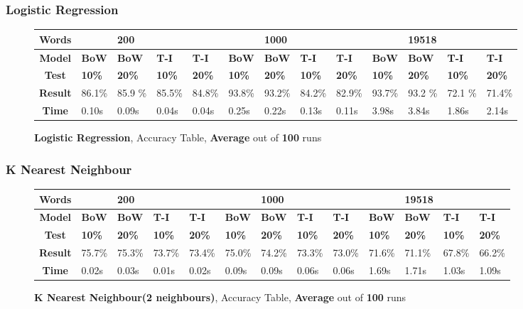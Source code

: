 \documentclass{article}
\begin{document}
	\subsubsection{Logistic Regression}
	\begin{figure}[H]
		\begin{tabular}{||c||l|l|l|l||l|l|l|l||l|l|l|l||}
			\hline
			\textbf{Words} &  & \textbf{200} & & & &\textbf{1000} & & & & \textbf{19518} &  & \\ \hline 
			\textbf{Model} & \textbf{BoW} & \textbf{BoW} & \textbf{T-I} & \textbf{T-I} &\textbf{BoW} & \textbf{BoW} & \textbf{T-I} & \textbf{T-I} & \textbf{BoW} & \textbf{BoW} & \textbf{T-I} & \textbf{T-I}\\ \hline
			\textbf{Test} & \textbf{10\%} & \textbf{20\%} & \textbf{10\%} & \textbf{20\%} & \textbf{10\%} & \textbf{20\%} & \textbf{10\%} & \textbf{20\%} & \textbf{10\%} & \textbf{20\%} & \textbf{10\%} & \textbf{20\%} \\ \hline \hline  
			\textbf{Result} & 86.1\% &85.9 \% & 85.5\% & 84.8\% &93.8\% &93.2\% &84.2\% & 82.9\% & 93.7\% &93.2 \% &72.1 \% &71.4\% \\ \hline 
			\textbf{Time} & 0.10s & 0.09s & 0.04s & 0.04s & 0.25s & 0.22s & 0.13s &0.11s & 3.98s & 3.84s & 1.86s & 2.14s \\ \hline 
		\end{tabular}
		\caption{\textbf{Logistic Regression}, Accuracy Table, \textbf{Average} out of \textbf{100} runs}
	\end{figure} 

	\subsubsection{K Nearest Neighbour}
	\begin{figure}[H]
		\begin{tabular}{||c||l|l|l|l||l|l|l|l||l|l|l|l||}
			\hline
			\textbf{Words} &  & \textbf{200} & & & &\textbf{1000} & & & & \textbf{19518} &  & \\ \hline 
			\textbf{Model} & \textbf{BoW} & \textbf{BoW} & \textbf{T-I} & \textbf{T-I} &\textbf{BoW} & \textbf{BoW} & \textbf{T-I} & \textbf{T-I} & \textbf{BoW} & \textbf{BoW} & \textbf{T-I} & \textbf{T-I}\\ \hline
			\textbf{Test} & \textbf{10\%} & \textbf{20\%} & \textbf{10\%} & \textbf{20\%} & \textbf{10\%} & \textbf{20\%} & \textbf{10\%} & \textbf{20\%} & \textbf{10\%} & \textbf{20\%} & \textbf{10\%} & \textbf{20\%} \\ \hline \hline  
			\textbf{Result} & 75.7\% & 75.3\% & 73.7\% & 73.4\% & 75.0\% & 74.2\% & 73.3\% & 73.0\% & 71.6\% & 71.1\% & 67.8\% & 66.2\% \\ \hline 
			\textbf{Time} &0.02s & 0.03s & 0.01s & 0.02s & 0.09s & 0.09s & 0.06s & 0.06s & 1.69s & 1.71s & 1.03s & 1.09s \\ \hline 
		\end{tabular}
		\caption{\textbf{K Nearest Neighbour(2 neighbours)}, Accuracy Table, \textbf{Average} out of \textbf{100} runs}
	\end{figure}
\end{document}
